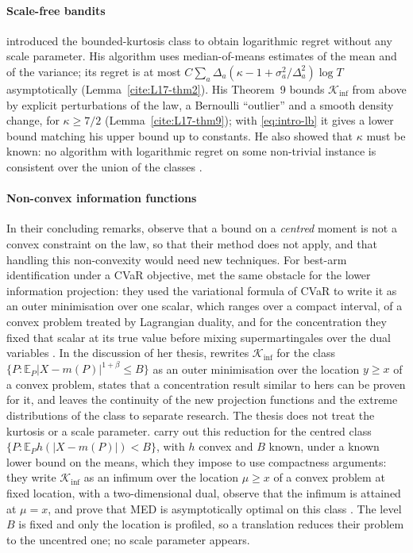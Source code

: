 \documentclass[11pt]{article}
\newcommand{\E}{\mathbb{E}}
\begin{document}
\paragraph{Scale-free bandits} \citet{L17} introduced the bounded-kurtosis class to obtain
logarithmic regret without any scale parameter. His algorithm uses median-of-means estimates of the
mean and of the variance; its regret is at most $C\sum_a\Delta_a(\kappa-1+\sigma_a^2/\Delta_a^2)\log T$
asymptotically (Lemma~\ref{cite:L17-thm2}). His Theorem~9 bounds $\mathcal{K}_{\inf}$ from above by explicit
perturbations of the law, a Bernoulli ``outlier'' and a smooth density change, for $\kappa\ge7/2$
(Lemma~\ref{cite:L17-thm9}); with \eqref{eq:intro-lb} it gives a lower bound matching his upper bound up
to constants. He also showed that $\kappa$ must be known: no algorithm with logarithmic regret on some
non-trivial instance is consistent over the union of the classes \citep[Theorem~7]{L17}.

\paragraph{Non-convex information functions} In their concluding remarks, \citet[Section~5]{AJK21}
observe that a bound on a \emph{centred} moment is not a convex constraint on the law, so that their
method does not apply, and that handling this non-convexity would need new techniques.
For best-arm identification under a CVaR objective, \citet{AKJ21} met the same obstacle for the lower information projection: they used the variational
formula of CVaR to write it as an outer minimisation over one scalar, which ranges over a compact
interval, of a convex problem treated by Lagrangian duality, and for the concentration they fixed that
scalar at its true value before mixing supermartingales over the dual variables \citep[see also][Chapter~6, Theorem~6.5 and Appendix~6.D.1]{A22}. In the discussion of her thesis,
\citet[Section~6.10]{A22} rewrites $\mathcal{K}_{\inf}$ for the class $\{P:\E_P|X-m(P)|^{1+\beta}\le B\}$ as an
outer minimisation over the location $y\ge x$ of a convex problem, states that a concentration result
similar to hers can be proven for it, and leaves the continuity of the new projection functions and the
extreme distributions of the class to separate research. The thesis does not treat the kurtosis or a
scale parameter. \citet[Section~4.4.2 and Appendix~D.5]{BSH23} carry out this reduction for the centred class
$\{P:\E_P h(|X-m(P)|)<B\}$, with $h$ convex and $B$ known, under a known lower bound on the means, which they
impose to use compactness arguments: they write $\mathcal{K}_{\inf}$ as an infimum over the location $\mu\ge x$ of a convex
problem at fixed location, with a two-dimensional dual, observe that the infimum is attained at $\mu=x$, and prove
that MED is asymptotically optimal on this class \citep[Lemma~9 and Corollary~6]{BSH23}. The level $B$ is fixed
and only the location is profiled, so a translation reduces their problem to the uncentred one; no scale
parameter appears.
\end{document}
